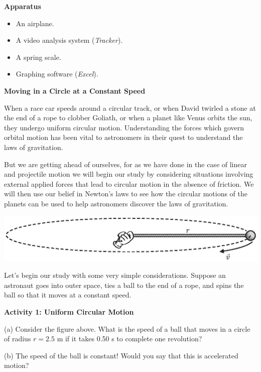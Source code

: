 \textbf{Apparatus}

\begin{itemize}
\item An airplane. 
\item A video analysis system (\textit{Tracker}). 
\item A spring scale. 
\item Graphing software (\textit{Excel}). 
\end{itemize}
\textbf{Moving in a Circle at a Constant Speed }

When a race car speeds around a circular track, or when David twirled a stone
at the end of a rope to clobber Goliath, or when a planet like Venus orbits
the sun, they undergo uniform circular motion. Understanding the forces which
govern orbital motion has been vital to astronomers in their quest to understand
the laws of gravitation. 

But we are getting ahead of ourselves, for as we have done in the case of linear
and projectile motion we will begin our study by considering situations involving
external applied forces that lead to circular motion in the absence of friction.
We will then use our belief in Newton's laws to see how the circular motions
of the planets can be used to help astronomers discover the laws of gravitation.

\vspace{0.3cm}
{\par\centering \includegraphics{centripetal/centripetal_fig2_new.eps} \par}
\vspace{0.3cm}

Let's begin our study with some very simple considerations. Suppose an astronaut
goes into outer space, ties a ball to the end of a rope, and spins the ball
so that it moves at a constant speed.

\textbf{Activity 1: Uniform Circular Motion }

(a) Consider the figure above. What is the speed of a ball that moves in a circle
of radius $r = 2.5$ m if it takes 0.50 s to complete one revolution?
\answerspace{20mm}

(b) The speed of the ball is constant! Would you say that this is accelerated
motion?
\answerspace{20mm}

